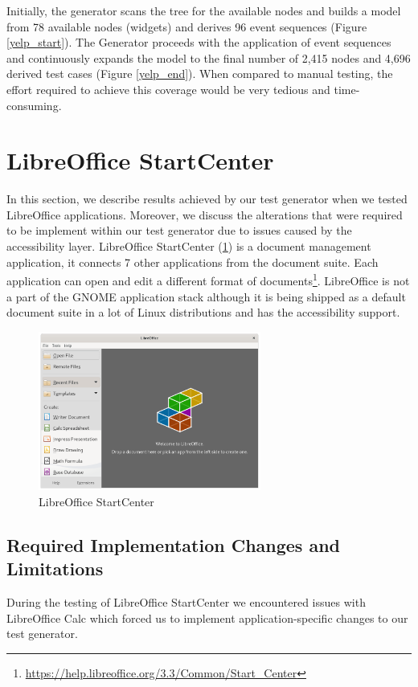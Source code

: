 Initially, the generator scans the tree for the available nodes and builds a model from 78 available nodes (widgets) and derives 96 event sequences (Figure \ref{yelp_start}). The Generator proceeds with the application of event sequences and continuously expands the model to the final number of 2,415 nodes and 4,696 derived test cases (Figure \ref{yelp_end}). When compared to manual testing, the effort required to achieve this coverage would be very tedious and time-consuming. 

\section{LibreOffice StartCenter}
In this section, we describe results achieved by our test generator when we tested LibreOffice applications. Moreover, we discuss the alterations that were required to be implement within our test generator due to issues caused by the accessibility layer. 
LibreOffice StartCenter (\ref{libreoffice-gui}) is a document management application, it connects 7 other applications from the document suite. Each application can open and edit a different format of documents\footnote{\url{https://help.libreoffice.org/3.3/Common/Start_Center}}. LibreOffice is not a part of the GNOME application stack although it is being shipped as a default document suite in a lot of Linux distributions and has the accessibility support.

\begin{figure}[H]
	\centering
	\includegraphics[width=0.65\textwidth,clip]{obrazky-figures/libreoffice_GUI.png}
	\caption{LibreOffice StartCenter}
	\label{libreoffice-gui}
\end{figure}


\subsection*{Required Implementation Changes and Limitations}
During the testing of LibreOffice StartCenter we encountered issues with LibreOffice Calc which forced us to implement application-specific changes to our test generator. 

